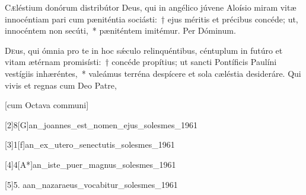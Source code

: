 \documentclass[vesperale_romanum.tex]{subfiles}
\begin{document}
\myrule

\duplex

\oratio

\lettrine{C}{æ}léstium donórum distribútor Deus, qui in angélico júvene Aloísio miram vitæ innocéntiam pari cum pæniténtia sociásti:~† ejus méritis et précibus concéde; ut, innocéntem non secúti,~* pæniténtem imitémur.
Per Dóminum.


\capitdeseq
\myrule

\newpage
{}
\duplex

\oratio

\lettrine{D}{e}us, qui ómnia pro te in hoc sǽculo relinquéntibus, céntuplum in futúro et vitam ætérnam promisísti:~† concéde propítius; ut sancti Pontíficis Paulíni vestígiis inhæréntes,~* valeámus terréna despícere et sola cæléstia desideráre. Qui vivis et regnas cum Deo Patre,

\hicvir

\myrule



\simplex

\vespsequenti
\myrule

\newpage



[cum Octava communi]



[2]{8}[G]{an_joannes_est_nomen_ejus_solesmes_1961}

[3]{1}[f]{an_ex_utero_senectutis_solesmes_1961}
 \label{111_1f_jun_24}

[4]{4}[A*]{an_iste_puer_magnus_solesmes_1961}

[5]{5. a}{an_nazaraeus_vocabitur_solesmes_1961}
\end{document}
